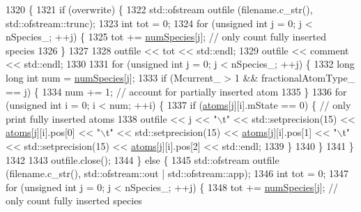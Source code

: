 \begin{DoxyCode}
1320                                                                                     \{
1321     \textcolor{keywordflow}{if} (overwrite) \{
1322         std::ofstream outfile (filename.c\_str(), std::ofstream::trunc);
1323         \textcolor{keywordtype}{int} tot = 0;
1324         \textcolor{keywordflow}{for} (\textcolor{keywordtype}{unsigned} \textcolor{keywordtype}{int} j = 0; j < nSpecies\_; ++j) \{
1325             tot += \hyperlink{classsim_system_a9eea865e6dc1cff377b1e79c4d9c23f0}{numSpecies}[j]; \textcolor{comment}{// only count fully inserted species}
1326         \}
1327 
1328         outfile << tot << std::endl;
1329         outfile << comment << std::endl;
1330 
1331         \textcolor{keywordflow}{for} (\textcolor{keywordtype}{unsigned} \textcolor{keywordtype}{int} j = 0; j < nSpecies\_; ++j) \{
1332             \textcolor{keywordtype}{long} \textcolor{keywordtype}{long} \textcolor{keywordtype}{int} num = \hyperlink{classsim_system_a9eea865e6dc1cff377b1e79c4d9c23f0}{numSpecies}[j];
1333             \textcolor{keywordflow}{if} (Mcurrent\_ > 1 && fractionalAtomType\_ == j) \{
1334                 num += 1; \textcolor{comment}{// account for partially inserted atom}
1335             \}
1336             \textcolor{keywordflow}{for} (\textcolor{keywordtype}{unsigned} \textcolor{keywordtype}{int} i = 0; i < num; ++i) \{
1337                 \textcolor{keywordflow}{if} (\hyperlink{classsim_system_a90421b19082f7fb8fc23b7264b1161e4}{atoms}[j][i].mState == 0) \{ \textcolor{comment}{// only print fully inserted atoms}
1338                     outfile << j << \textcolor{stringliteral}{"\(\backslash\)t"} <<  std::setprecision(15) << \hyperlink{classsim_system_a90421b19082f7fb8fc23b7264b1161e4}{atoms}[j][i].pos[0] << \textcolor{stringliteral}{"\(\backslash\)t"} << 
      std::setprecision(15) << \hyperlink{classsim_system_a90421b19082f7fb8fc23b7264b1161e4}{atoms}[j][i].pos[1] << \textcolor{stringliteral}{"\(\backslash\)t"} << std::setprecision(15) << 
      \hyperlink{classsim_system_a90421b19082f7fb8fc23b7264b1161e4}{atoms}[j][i].pos[2] << std::endl;
1339                 \}
1340             \}
1341         \}
1342 
1343         outfile.close();
1344     \} \textcolor{keywordflow}{else} \{
1345         std::ofstream outfile (filename.c\_str(), std::ofstream::out | std::ofstream::app);
1346         \textcolor{keywordtype}{int} tot = 0;
1347         \textcolor{keywordflow}{for} (\textcolor{keywordtype}{unsigned} \textcolor{keywordtype}{int} j = 0; j < nSpecies\_; ++j) \{
1348             tot += \hyperlink{classsim_system_a9eea865e6dc1cff377b1e79c4d9c23f0}{numSpecies}[j]; \textcolor{comment}{// only count fully inserted species}

\end{DoxyCode}
